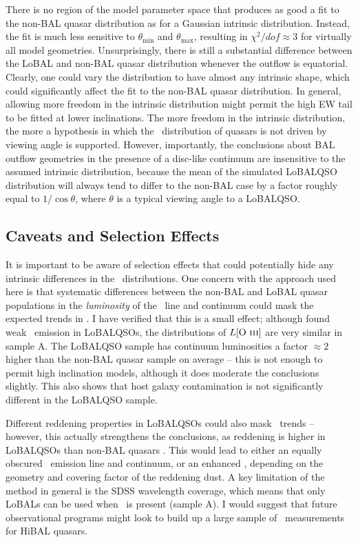 There is no region of the model parameter space that produces as good a fit to
the non-BAL quasar distribution as for a Gaussian intrinsic distribution. Instead, 
the fit is much less sensitive to $\theta_{\mathrm{min}}$ and $\theta_{\mathrm{max}}$, 
resulting in $\chi^2/dof\approx3$ for virtually all model geometries. 
Unsurprisingly, there is still a substantial difference between the LoBAL and 
non-BAL quasar distribution whenever the outflow is equatorial. Clearly, one could vary the 
distribution to have almost any intrinsic shape, which could significantly
affect the fit to the non-BAL quasar distribution. In general, allowing more freedom in the 
intrinsic distribution might permit the high EW tail to be fitted at lower inclinations.
The more freedom in the intrinsic distribution, the more a hypothesis in which 
the \ewo\ distribution of quasars is not driven by viewing angle is supported.
However, importantly, the conclusions about BAL outflow geometries in the presence of
a disc-like continuum are insensitive to the assumed intrinsic distribution, because
the mean of the simulated LoBALQSO distribution will always tend to differ to the non-BAL case
by a factor roughly equal to $1/\cos \theta$, where $\theta$ is a typical viewing angle to a 
LoBALQSO.


\subsection{Caveats and Selection Effects}

It is important to be aware of selection effects that
could potentially hide any intrinsic differences in the \ewo\ distributions. 
One concern with the approach used here is that systematic differences between the
non-BAL and LoBAL quasar populations in the {\em luminosity} of the \oiiifull\ line 
and continuum could mask the expected trends in \ewo. I have verified that this is a 
small effect; although \cite{boroson1992} found weak \oiiifull\ emission in LoBALQSOs,
the distributions of $L[\mathrm{O~\textsc{iii}}]$ are very similar in sample A. 
The LoBALQSO sample has continuum luminosities a factor $\approx2$ higher than the
non-BAL quasar sample on average -- this is not enough to
permit high inclination models, although it does moderate the conclusions slightly.
This also shows that host galaxy contamination is not significantly different in 
the LoBALQSO sample. 

Different reddening properties in LoBALQSOs could also mask
\ewo\ trends -- however, this actually strengthens the conclusions, as
reddening is higher in LoBALQSOs than non-BAL quasars 
\citep[e.g.][]{urrutia2009}.
This would lead to either an equally obscured \oiiifull\ emission line and continuum, 
or an enhanced \ewo, depending on the geometry and covering factor of the reddening
dust. A key limitation of the method in general is the SDSS wavelength coverage,
which means that only LoBALs can be used when \ewo\ is present (sample A).
I would suggest that future observational programs might 
look to build up a large sample of \ewo\ measurements for HiBAL
quasars. 

